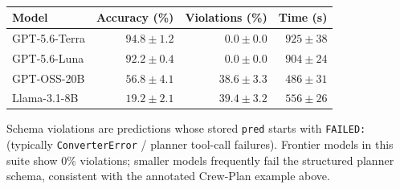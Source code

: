 \begin{table}[h]
\centering\footnotesize
\renewcommand{\arraystretch}{0.95}
\setlength{\tabcolsep}{4pt}
\caption{}
\label{tab:determinism-math100}
\begin{tabular}{lrrr}
\toprule
Model & Accuracy (\%) & Violations (\%) & Time (s) \\
\midrule
GPT-5.6-Terra & $94.8 \pm 1.2$ & $0.0 \pm 0.0$  & $925 \pm 38$ \\
GPT-5.6-Luna  & $92.2 \pm 0.4$ & $0.0 \pm 0.0$  & $904 \pm 24$ \\
GPT-OSS-20B   & $56.8 \pm 4.1$ & $38.6 \pm 3.3$ & $486 \pm 31$ \\
Llama-3.1-8B  & $19.2 \pm 2.1$ & $39.4 \pm 3.2$ & $556 \pm 26$ \\
\bottomrule
\end{tabular}
\end{table}

\noindent
Schema violations are predictions whose stored \texttt{pred} starts with \texttt{FAILED:}
(typically \texttt{ConverterError} / planner tool-call failures). Frontier models in this
suite show $0\%$ violations; smaller models frequently fail the structured planner schema,
consistent with the annotated Crew-Plan example above.
